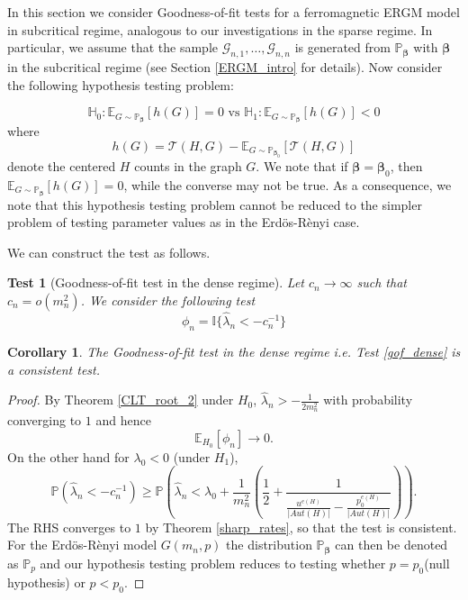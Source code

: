 \documentclass[12pt]{article}
\def\P{\mathbb{P}}
\def\E{\mathbb{E}}
\def\H{\mathbb{H}}
\def\er{ Erd{\"o}s-R{\`e}nyi }
\numberwithin{equation}{section}
\newtheorem{corollary}{Corollary}[section]
\newtheorem{test}{Test}[section]
\def\bbeta{\boldsymbol{\beta}}
\begin{document}
In this section we consider Goodness-of-fit tests for a ferromagnetic ERGM model in subcritical regime, analogous to our investigations in the sparse regime. In particular, we assume that the sample $\mathcal{G}_{n,1}, \ldots, \mathcal{G}_{n,n}$ is generated from 
$\P_{\bbeta}$ with $\bbeta$ in the subcritical regime (see Section \ref{ERGM_intro} for details). Now consider the following hypothesis testing problem:

\begin{equation}
\H_0: \mathbb{E}_{G\sim\mathbb{P}_{\bbeta}}[h(G)]=0 \text{ vs } \H_1: \mathbb{E}_{G\sim\mathbb{P}_{\bbeta}}[h(G)]< 0 
\end{equation}
where
$$h(G)= \mathcal{T}(H,G)-\E_{G\sim \P_{{\bbeta_0}}}[\mathcal{T}(H,G)]$$
denote the centered \(H\) counts in the graph $G$. We note that if $\bbeta=\bbeta_0$, then $\mathbb{E}_{G\sim\mathbb{P}_{\bbeta}}[h(G)]=0$, while the converse may not be true. As a consequence, we note that this hypothesis testing problem cannot be reduced to the simpler problem of testing parameter values as in the \er case.

We can construct the test as follows.

\begin{test}[Goodness-of-fit test in the dense regime]{\label{gof_dense}}Let $c_n\rightarrow \infty$ such that $c_n=o(m^2_n)$. We consider the following test 
\[\phi_{n}=\mathbb{I}\{\hat{\lambda}_n<-c^{-1}_n\}\]
\end{test}

\begin{corollary}
The Goodness-of-fit test in the dense regime  i.e. Test \ref{gof_dense} is a consistent test.
\end{corollary}

\begin{proof}
By Theorem \ref{CLT_root_2} under $H_0$, $\hat{\lambda}_n>-\frac{1}{2m^2_n}$ with probability converging to $1$ and hence $$\E_{H_0}[\phi_n]\rightarrow 0.$$
On the other hand for $\lambda_0<0$ (under $H_1$),
$$\P(\hat{\lambda}_n<-c_n^{-1})\geq \P\left(\hat{\lambda}_n<\lambda_0+\frac{1}{m^2_n}\left(\frac{1}{2}+\frac{1}{\frac{u^{e(H)}}{\lvert Aut(H)\rvert}-\frac{p_0^{e(H)}}{\lvert Aut(H)\rvert}}\right)\right).$$
The RHS converges to $1$ by Theorem \ref{sharp_rates}, so that the test is consistent. 
 For the \er model $G(m_n,p)$ the distribution $\P_{\bbeta}$ can then be denoted as $\P_{p}$ and our hypothesis testing problem reduces to testing whether $p=p_0$(null hypothesis) or $p<p_0$.
 \end{proof}
\end{document}
